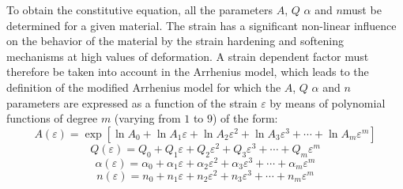 \documentclass[twoside,english,1p,final,sort&compress]{elsarticle}
\theoremstyle{plain}
\begin{document}
To obtain the constitutive equation, all the parameters $A$, $Q$ $\alpha$ and $n$must be determined for a given material. The strain has a significant non-linear influence on the behavior of the material by the  strain hardening and softening mechanisms at high values of deformation.
A strain dependent factor must therefore be taken into account in the Arrhenius model, which leads to the definition of the modified Arrhenius model for which the $A$, $Q$ $\alpha$ and $n$ parameters are expressed as a function of the strain $\varepsilon$ by means of polynomial functions of degree $m$ (varying from $1$ to $9$) of the form:
\begin{equation}
A(\varepsilon) = \exp{\left[\ln\!A_0 + \ln\!A_1\varepsilon + \ln\!A_2\varepsilon^2 + \ln\!A_3\varepsilon^3 + \cdots + \ln\!A_m\varepsilon^m\right]}
\label{eq:ArA}
\end{equation}
\begin{equation}
Q(\varepsilon) = Q_0 + Q_1\varepsilon + Q_2\varepsilon^2 + Q_3\varepsilon^3 + \cdots + Q_m\varepsilon^m
\label{eq:ArQ}
\end{equation}
\begin{equation}
\alpha(\varepsilon) = \alpha_0 + \alpha_1\varepsilon + \alpha_2\varepsilon^2 + \alpha_3\varepsilon^3 + \cdots + \alpha_m\varepsilon^m
\label{eq:Aralpha}
\end{equation}
\begin{equation}
n(\varepsilon) = n_0 + n_1\varepsilon + n_2\varepsilon^2 + n_3\varepsilon^3 + \cdots + n_m\varepsilon^m
\label{eq:Arn}
\end{equation}
\end{document}
